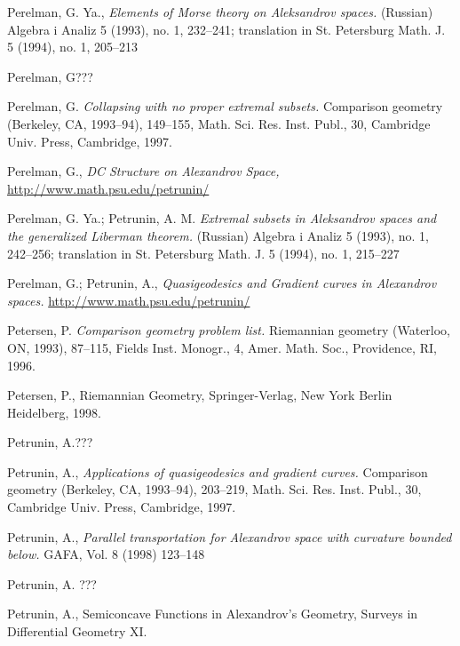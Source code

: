 \begin{thebibliography}{52}
Perelman, G. Ya., \textit{Elements of Morse theory on
Aleksandrov spaces.} (Russian)  Algebra i Analiz  5  (1993),  no. 1, 232--241; 
translation in  St. Petersburg Math. J.  5  (1994),  no. 1, 205--213

Perelman, G???

 Perelman, G. \textit{Collapsing with no proper extremal subsets.}  Comparison geometry (Berkeley, CA, 1993--94),  149--155,
Math. Sci. Res. Inst. Publ., 30, Cambridge Univ. Press, Cambridge, 1997.


 Perelman, G., \textit{DC Structure on Alexandrov Space,}\\ \href{http://www.math.psu.edu/petrunin/papers/papers.html}{http://www.math.psu.edu/petrunin/}

 Perelman, G. Ya.; Petrunin, A. M.
\textit{Extremal subsets in Aleksandrov spaces and the generalized Liberman theorem.}
(Russian)  Algebra i Analiz  5  (1993),  no. 1, 242--256;  translation in  St.
Petersburg Math. J.  5  (1994),  no. 1, 215--227

 Perelman, G.; Petrunin,  A., \textit{Quasigeodesics and Gradient curves in Alexandrov spaces.}
 \href{http://www.math.psu.edu/petrunin/papers/papers.html}{http://www.math.psu.edu/petrunin/}

 Petersen, P. \textit{Comparison geometry problem list.} Riemannian geometry (Waterloo, ON, 1993), 87--115,
Fields Inst. Monogr., 4, Amer. Math. Soc., Providence, RI, 1996. 

 Petersen, P., Riemannian Geometry,
Springer-Verlag, New York Berlin Heidelberg, 1998.

Petrunin, A.???

 Petrunin, A., \textit{Applications of quasigeodesics
and gradient curves.}  Comparison geometry (Berkeley, CA, 1993--94),  203--219,
Math. Sci. Res. Inst. Publ., 30, Cambridge Univ. Press, Cambridge, 1997.

 Petrunin, A., \textit{Parallel transportation for Alexandrov space with curvature bounded below.}  GAFA, Vol. 8 (1998) 123--148

 Petrunin, A. ???

 Petrunin, A.,  Semiconcave Functions in Alexandrov's Geometry, Surveys in Differential Geometry XI.


\end{thebibliography}
